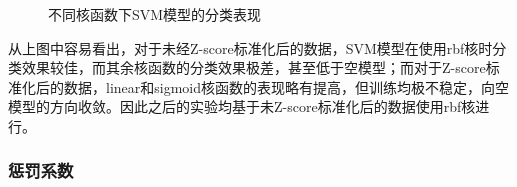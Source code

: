 \documentclass[12pt,a4paper]{article}
\theoremstyle{definition}
\begin{document}
{\begin{figure}[H]
	\centering
	\caption{不同核函数下SVM模型的分类表现}
	\label{fig:svm-kernel1}
\end{figure}

\vspace{0.01\linewidth}
从上图中容易看出，对于未经Z-score标准化后的数据，SVM模型在使用rbf核时分类效果较佳，而其余核函数的分类效果极差，甚至低于空模型；而对于Z-score标准化后的数据，linear和sigmoid核函数的表现略有提高，但训练均极不稳定，向空模型的方向收敛。因此之后的实验均基于未Z-score标准化后的数据使用rbf核进行。

\subsubsection{惩罚系数}
\label{sec:penalty}

}
\end{document}

